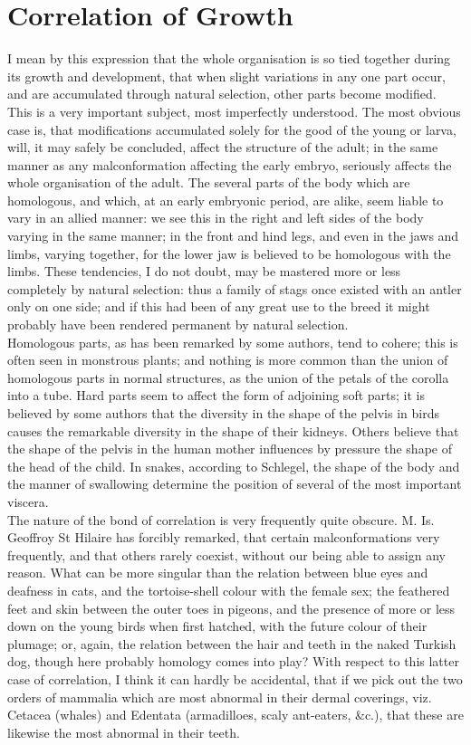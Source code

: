 \section{Correlation of Growth}
\indent I mean by this expression that the whole organisation is so tied together during its growth and development, that when slight variations in any one part occur, and are accumulated through natural selection, other parts become modified. This is a very important subject, most imperfectly understood. The most obvious case is, that modifications accumulated solely for the good of the young or larva, will, it may safely be concluded, affect the structure of the adult; in the same manner as any malconformation affecting the early embryo, seriously affects the whole organisation of the adult. The several parts of the body which are homologous, and which, at an early embryonic period, are alike, seem liable to vary in an allied manner: we see this in the right and left sides of the body varying in the same manner; in the front and hind legs, and even in the jaws and limbs, varying together, for the lower jaw is believed to be homologous with the limbs. These tendencies, I do not doubt, may be mastered more or less completely by natural selection: thus a family of stags once existed with an antler only on one side; and if this had been of any great use to the breed it might probably have been rendered permanent by natural selection.\\
\indent Homologous parts, as has been remarked by some authors, tend to cohere; this is often seen in monstrous plants; and nothing is more common than the union of homologous parts in normal structures, as the union of the petals of the corolla into a tube. Hard parts seem to affect the form of adjoining soft parts; it is believed by some authors that the diversity in the shape of the pelvis in birds causes the remarkable diversity in the shape of their kidneys. Others believe that the shape of the pelvis in the human mother influences by pressure the shape of the head of the child. In snakes, according to Schlegel, the shape of the body and the manner of swallowing determine the position of several of the most important viscera.\\
\indent The nature of the bond of correlation is very frequently quite obscure. M. Is. Geoffroy St Hilaire has forcibly remarked, that certain malconformations very frequently, and that others rarely coexist, without our being able to assign any reason. What can be more singular than the relation between blue eyes and deafness in cats, and the tortoise-shell colour with the female sex; the feathered feet and skin between the outer toes in pigeons, and the presence of more or less down on the young birds when first hatched, with the future colour of their plumage; or, again, the relation between the hair and teeth in the naked Turkish dog, though here probably homology comes into play? With respect to this latter case of correlation, I think it can hardly be accidental, that if we pick out the two orders of mammalia which are most abnormal in their dermal coverings, viz. Cetacea (whales) and Edentata (armadilloes, scaly ant-eaters, \&c.), that these are likewise the most abnormal in their teeth.\\

